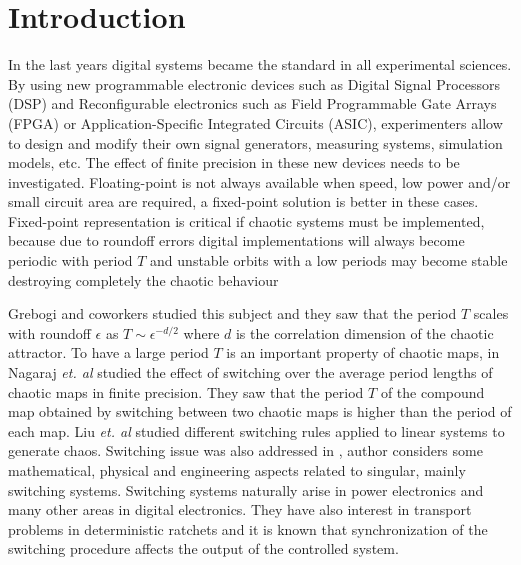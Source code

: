 \section{Introduction} \label{sec:intro}

In the last years digital systems became the standard in all experimental sciences.
By using new programmable electronic devices such as Digital Signal Processors (DSP) and Reconfigurable electronics such as Field Programmable Gate Arrays (FPGA) or Application-Specific Integrated Circuits (ASIC), experimenters allow to design and modify their own signal generators, measuring systems, simulation models, etc.
The effect of finite precision in these new devices needs to be investigated.
Floating-point is not always available when speed, low power and/or small circuit area are required, a fixed-point solution is better in these cases.
Fixed-point representation is critical if chaotic systems must be implemented, because due to roundoff errors digital implementations will always become periodic with period $T$ and unstable orbits with a low periods may become stable destroying completely the chaotic behaviour

Grebogi and coworkers \cite{Grebogi1988} studied this subject and they saw that the period $T$ scales with roundoff $\epsilon$ as $T\sim\epsilon^{-d/2}$ where $d$ is the correlation dimension of the chaotic attractor.
To have a large period $T$ is an important property of chaotic maps, in \cite{Nagaraj2008} Nagaraj \textit{et. al} studied the effect of switching over the average period lengths of chaotic maps in finite precision.
They saw that the period $T$ of the compound map obtained by switching between two chaotic maps is higher than the period of each map.
Liu \textit{et. al} \cite{Liu2006} studied different switching rules applied to linear systems to generate chaos.
Switching issue was also addressed in \cite{Gluskin2008}, author considers some mathematical, physical and engineering aspects related to singular, mainly switching systems.
Switching systems naturally arise in power electronics and many other areas in digital electronics.
They have also interest in transport problems in deterministic ratchets \cite{Zarlenga2009} and it is known that synchronization of the switching procedure affects the output of the controlled system.

